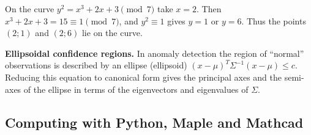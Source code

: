 \begin{misol}
On the curve $y^2=x^3+2x+3\pmod7$ take $x=2$. Then $x^3+2x+3=15\equiv1\pmod7$,
and $y^2\equiv1$ gives $y=1$ or $y=6$. Thus the points $(2;1)$ and $(2;6)$ lie
on the curve.
\end{misol}

\textbf{Ellipsoidal confidence regions.} In anomaly detection the region of
“normal” observations is described by an ellipse (ellipsoid)
$(x-\mu)^T\Sigma^{-1}(x-\mu)\le c$. Reducing this equation to canonical form
gives the principal axes and the semi-axes of the ellipse in terms of the
eigenvectors and eigenvalues of $\Sigma$.

\subsection{Computing with Python, Maple and Mathcad}

